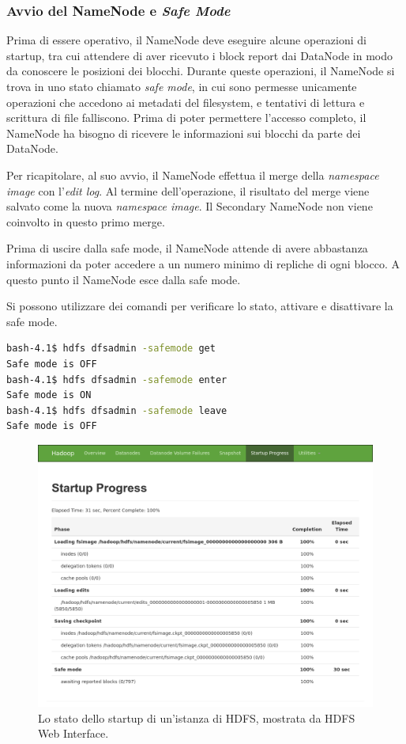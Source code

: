 \documentclass[italian,a4paper, twoside, 12pt]{report}
\begin{document}
\hypertarget{safe-mode}{\subsubsection{\texorpdfstring{Avvio del
NameNode e \emph{Safe
Mode}}{Avvio del NameNode e Safe Mode}}\label{safe-mode}}

Prima di essere operativo, il NameNode deve eseguire alcune operazioni
di startup, tra cui attendere di aver ricevuto i block report dai
DataNode in modo da conoscere le posizioni dei blocchi. Durante queste
operazioni, il NameNode si trova in uno stato chiamato \emph{safe mode},
in cui sono permesse unicamente operazioni che accedono ai metadati del
filesystem, e tentativi di lettura e scrittura di file falliscono. Prima
di poter permettere l'accesso completo, il NameNode ha bisogno di
ricevere le informazioni sui blocchi da parte dei DataNode.

Per ricapitolare, al suo avvio, il NameNode effettua il merge della
\emph{namespace image} con l'\emph{edit log}. Al termine
dell'operazione, il risultato del merge viene salvato come la nuova
\emph{namespace image}. Il Secondary NameNode non viene coinvolto in
questo primo merge.

Prima di uscire dalla safe mode, il NameNode attende di avere abbastanza
informazioni da poter accedere a un numero minimo di repliche di ogni
blocco. A questo punto il NameNode esce dalla safe mode.

Si possono utilizzare dei comandi per verificare lo stato, attivare e
disattivare la safe mode.

\begin{lstlisting}[language=sh]
bash-4.1$ hdfs dfsadmin -safemode get
Safe mode is OFF
bash-4.1$ hdfs dfsadmin -safemode enter
Safe mode is ON
bash-4.1$ hdfs dfsadmin -safemode leave
Safe mode is OFF
\end{lstlisting}

\begin{figure}
\centering
\includegraphics{img/hdfs-web-startup.png}
\caption{Lo stato dello startup di un'istanza di HDFS, mostrata da HDFS
Web Interface.}
\end{figure}
\end{document}
